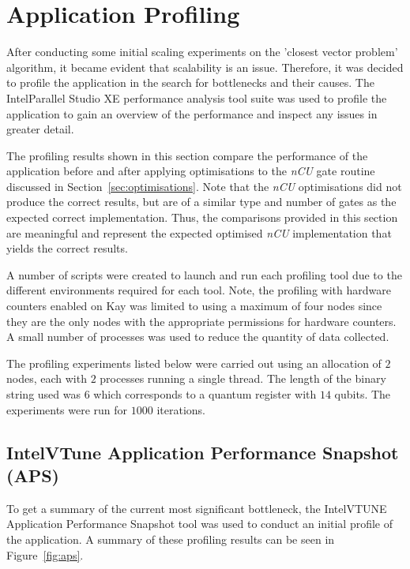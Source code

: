 \section{Application Profiling}
\label{sec:Application_Profiling}
After conducting some initial scaling experiments on the 'closest vector problem' algorithm, it became evident that scalability is an issue. Therefore, it was decided to profile the application in the search for bottlenecks and their causes. The Intel\textregistered Parallel Studio XE performance analysis tool suite was used to profile the application to gain an overview of the performance and inspect any issues in greater detail.

The profiling results shown in this section compare the performance of the application before and after applying optimisations to the \textit{nCU} gate routine discussed in Section~\ref{sec:optimisations}. Note that the \textit{nCU} optimisations did not produce the correct results, but are of a similar type and number of gates as the expected correct implementation. Thus, the comparisons provided in this section are meaningful and represent the expected optimised \textit{nCU} implementation that yields the correct results.

A number of scripts were created to launch and run each profiling tool due to the different environments required for each tool. Note, the profiling with hardware counters enabled on Kay was limited to using a maximum of four nodes since they are the only nodes with the appropriate permissions for hardware counters. A small number of processes was used to reduce the quantity of data collected.

The profiling experiments listed below were carried out using an allocation of $2$ nodes, each with $2$ processes running a single thread. The length of the binary string used was $6$ which corresponds to a quantum register with $14$ qubits. The experiments were run for $1000$ iterations. 

\subsection{Intel\textregistered VTune Application Performance Snapshot (APS)}
\label{sec:Intel_aps}
To get a summary of the current most significant bottleneck, the Intel\textregistered VTUNE Application Performance Snapshot tool was used to conduct an initial profile of the application. A summary of these profiling results can be seen in Figure~\ref{fig:aps}. 


